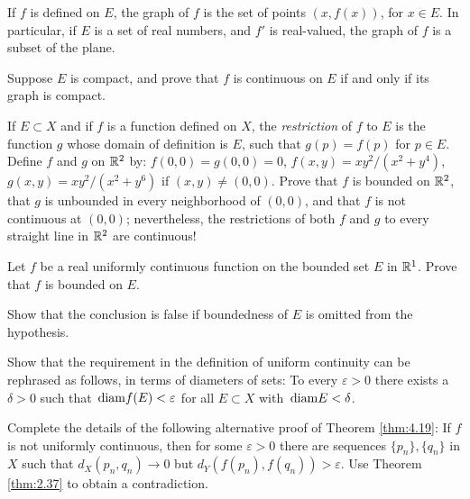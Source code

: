 \begin{myExercise}
    \label{ex:4.6}
    If $f$ is defined on $E$, the graph of $f$ is the set of points $(x, f(x))$, for $x \in E$. 
    In particular, if $E$ is a set of real numbers, and $f'$ is real-valued, the graph of $f$ is a subset of the plane.
    
    Suppose $E$ is compact, and prove that $f$ is continuous on $E$ if and only if its graph is compact.
\end{myExercise}


\begin{myExercise}
    \label{ex:4.7}
    If $E \subset X$ and if $f$ is a function defined on $X$, 
    the \emph{restriction} of $f$ to $E$ is the function $g$ whose domain of definition is $E$, such that $g(p) =f(p)$ for $p \in E$. 
    Define $f$ and $g$ on ${\protect\mathbb R}^2$ by: 
    $f(0, 0) = g(0, 0) = 0$, 
    $f(x, y) = xy^2 /(x^2 + y^4)$, 
    $g(x, y) = xy^2 /(x^2 + y^6)$ 
    if $(x, y) \neq  (0, 0)$. 
    Prove that $f$ is bounded on ${\protect\mathbb R}^2$, 
    that $g$ is unbounded in every neighborhood of $(0, 0)$, 
    and that $f$ is not continuous at $(0, 0)$; 
    nevertheless, the restrictions of both $f$ and $g$ to every straight line in ${\protect\mathbb R}^2$ are continuous!
\end{myExercise}


\begin{myExercise}
    \label{ex:4.8}
    Let $f$ be a real uniformly continuous function on the bounded set $E$ in ${\protect\mathbb R}^1$. 
    Prove that $f$ is bounded on $E$. 

    Show that the conclusion is false if boundedness of $E$ is omitted from the hypothesis.
\end{myExercise}


\begin{myExercise}
    \label{ex:4.9}
    Show that the requirement in the definition of uniform continuity can be rephrased as follows, in terms of diameters of sets: 
    To every $\varepsilon > 0$ there exists a $\delta > 0$ 
    such that $\protect\mathop{}\mathrm{diam} f(E) < \varepsilon$ for all $E \subset X$ with $\protect\mathop{}\mathrm{diam} E < \delta$.
\end{myExercise}


\begin{myExercise}
    \label{ex:4.10}
    Complete the details of the following alternative proof of Theorem \ref{thm:4.19}: 
    If $f$ is not uniformly continuous, 
    then for some $\varepsilon > 0$ there are sequences $\{p_n\}, \{q_n\}$ in $X$ such that $d_X(p_n, q_n) \rightarrow 0$ but $d_Y(f(p_n),f(q_n)) > \varepsilon$. 
    Use Theorem \ref{thm:2.37} to obtain a contradiction.
\end{myExercise}


